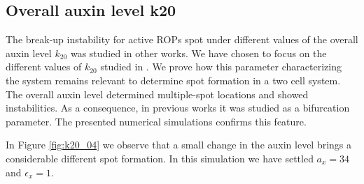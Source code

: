 \subsection{Overall auxin level k20}\label{sec:k20}
The break-up instability for active ROPs spot under different values of the overall auxin level $k_{20}$ was studied in other works. We have chosen to focus on the different values of $k_{20}$ studied in \cite{intra1_R, intra2}. We prove how this parameter characterizing the system remains relevant to determine spot formation in a two cell system. The overall auxin level determined multiple-spot locations and showed instabilities. As a consequence, in previous works it was studied as a bifurcation parameter. The presented numerical simulations confirms this feature.

In Figure \ref{fig:k20_04} we observe that a small change in the auxin level brings a considerable different spot formation. In this simulation we have settled $a_x = 34$ and $\epsilon_x = 1$.

